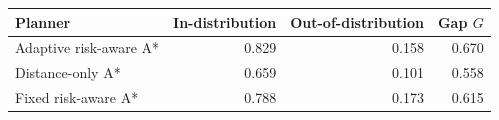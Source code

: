 \begin{tabular}{lrrr}
\toprule
Planner & In-distribution & Out-of-distribution & Gap $G$ \\
\midrule
Adaptive risk-aware A* & 0.829 & 0.158 & 0.670 \\
Distance-only A* & 0.659 & 0.101 & 0.558 \\
Fixed risk-aware A* & 0.788 & 0.173 & 0.615 \\
\bottomrule
\end{tabular}

